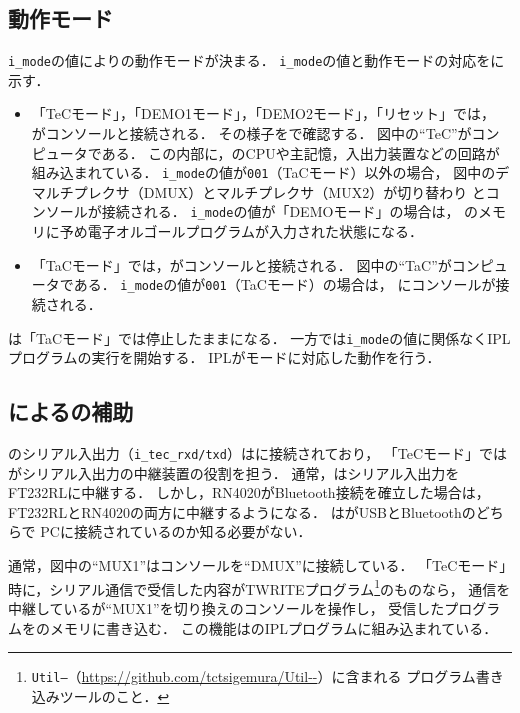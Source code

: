 \subsection{動作モード}
\label{tec7mode}
\texttt{i\_mode}の値により{\tecS}の動作モードが決まる．
\texttt{i\_mode}の値と動作モードの対応をに示す．

\begin{itemize}
\item 「TeCモード」，「DEMO1モード」，「DEMO2モード」，「リセット」では，
  {\tec}がコンソールと接続される．
  その様子をで確認する．
  図中の``TeC''が{\tec}コンピュータである．
  この内部に，{\tec}のCPUや主記憶，入出力装置などの回路が組み込まれている．
  \texttt{i\_mode}の値が\texttt{001}（TaCモード）以外の場合，
  図中のデマルチプレクサ（DMUX）とマルチプレクサ（MUX2）が切り替わり
  {\tec}とコンソールが接続される．
  \texttt{i\_mode}の値が「DEMOモード」の場合は，
  {\tec}のメモリに予め電子オルゴールプログラムが入力された状態になる．
\item 「TaCモード」では，{\tac}がコンソールと接続される．
  図中の``TaC''が{\tac}コンピュータである．
  \texttt{i\_mode}の値が\texttt{001}（TaCモード）の場合は，
  {\tac}にコンソールが接続される．
\end{itemize}

{\tec}は「TaCモード」では停止したままになる．
一方で{\tac}は\texttt{i\_mode}の値に関係なくIPLプログラムの実行を開始する．
IPLがモードに対応した動作を行う．

\subsection{{\tac}による{\tec}の補助}
\label{tec7assist}
{\tec}のシリアル入出力（\texttt{i\_tec\_rxd/txd}）は{\tac}に接続されており，
「TeCモード」では{\tac}がシリアル入出力の中継装置の役割を担う．
通常，{\tac}はシリアル入出力をFT232RLに中継する．
しかし，RN4020がBluetooth接続を確立した場合は，
FT232RLとRN4020の両方に中継するようになる．
{\tec}は{\tecS}がUSBとBluetoothのどちらで
PCに接続されているのか知る必要がない．

通常，図中の``MUX1''はコンソールを``DMUX''に接続している．
「TeCモード」時に，シリアル通信で受信した内容がTWRITEプログラム\footnote{
\texttt{Util--}（\url{https://github.com/tctsigemura/Util--}）に含まれる
プログラム書き込みツールのこと．}のものなら，
通信を中継している{\tac}が``MUX1''を切り換え{\tec}のコンソールを操作し，
受信したプログラムを{\tec}のメモリに書き込む．
この機能は{\tac}のIPLプログラムに組み込まれている．


